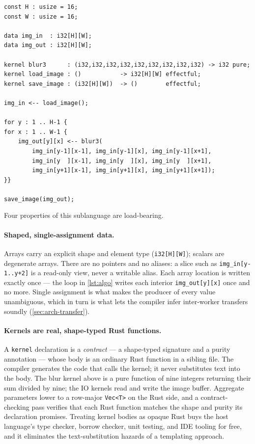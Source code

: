 \begin{lstlisting}[language=Nuc,caption={A complete algorithm file: a $3\times3$ stencil. It declares shape, kernels, and dataflow --- and nothing about decomposition.},label={lst:algo}]
const H : usize = 16;
const W : usize = 16;

data img_in  : i32[H][W];
data img_out : i32[H][W];

kernel blur3      : (i32,i32,i32,i32,i32,i32,i32,i32,i32) -> i32 pure;
kernel load_image : ()           -> i32[H][W] effectful;
kernel save_image : (i32[H][W])  -> ()        effectful;

img_in <-- load_image();

for y : 1 .. H-1 {
for x : 1 .. W-1 {
    img_out[y][x] <-- blur3(
        img_in[y-1][x-1], img_in[y-1][x], img_in[y-1][x+1],
        img_in[y  ][x-1], img_in[y  ][x], img_in[y  ][x+1],
        img_in[y+1][x-1], img_in[y+1][x], img_in[y+1][x+1]);
}}

save_image(img_out);
\end{lstlisting}

Four properties of this sublanguage are load-bearing.

\paragraph{Shaped, single-assignment data.} Arrays carry an explicit shape and
element type (\texttt{i32[H][W]}); scalars are degenerate arrays. There are no
pointers and no aliases: a slice such as \texttt{img\_in[y-1..y+2]} is a
read-only view, never a writable alias. Each array location is written exactly
once --- the loop in \cref{lst:algo} writes each interior \texttt{img\_out[y][x]}
once and no more. Single assignment is what makes the producer of every value
unambiguous, which in turn is what lets the compiler infer inter-worker
transfers soundly (\cref{sec:arch-transfer}).

\paragraph{Kernels are real, shape-typed Rust functions.} A \texttt{kernel}
declaration is a \emph{contract} --- a shape-typed signature and a purity
annotation --- whose body is an ordinary Rust function in a sibling file. The
compiler generates the code that calls the kernel; it never substitutes text into
the body. The blur kernel above is a pure function of nine integers returning
their sum divided by nine; the IO kernels read and write the image buffer.
Aggregate parameters lower to a row-major \texttt{Vec<T>} on the Rust side, and a
contract-checking pass verifies that each Rust function matches the shape and
purity its declaration promises. Treating kernel bodies as opaque Rust buys the
host language's type checker, borrow checker, unit testing, and IDE tooling for
free, and it eliminates the text-substitution hazards of a templating approach.

